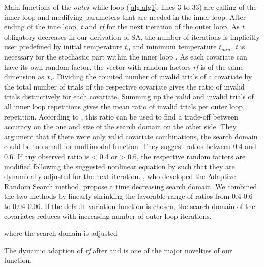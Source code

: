 Main functions of the \emph{outer} while loop (\ref{alg:alg1}, lines 3 to 33) are calling of the inner loop and modifying parameters that are needed in the inner loop. After ending of the inne loop, \textit{t}
 and \textit{rf} for the next iteration of the outer loop. As \textit{t} obligatory decreases in our derivation of SA, the number of iterations is implicitly user predefined by initial temperature $t_0$ and minimum temperature $t_{min}$. \textit{t} is necessary for the stochastic part within the inner loop \citep{kirkpatrick_1983}. As each covariate can have its own random factor, the vector with random factors \textit{rf} is of the same dimension as $x_i$. Dividing the counted number of invalid trials of a covariate by the total number of trials of the respective covariate gives the ratio of invalid trials distinctively for each covariate. Summing up the valid and invalid trials of all inner loop repetitions gives the mean ratio of invalid trials per outer loop repetition. According to \citep{corana_1987}, this ratio can be used to find a trade-off between accuracy on the one and size of the search domain on the other side. They argument that if there were only valid covariate combinations, the search domain could be too small for multimodal function. They suggest ratios between 0.4 and 0.6. If any observed ratio is < 0.4 or > 0.6, the respective random factors are modified following the suggested nonlinear equation by \citet{corana_1987} such that they are dynamically adjusted for the next iteration. \citet{pronzato_1984}, who developed the Adaptive Random Search method, propose a time decreasing search domain. We combined the two methods by linearly shrinking the favorable range of ratios from 0.4-0.6 to 0.04-0.06. If the default variation function is chosen, the search domain of the covariates reduces with increasing number of outer loop iterations.
 
 where the search domain is adjusted

 The dynamic adaption of \textit{rf} after \citet{corana_1987} and \citet{pronzato_1984} is one of the major novelties of our function. 

